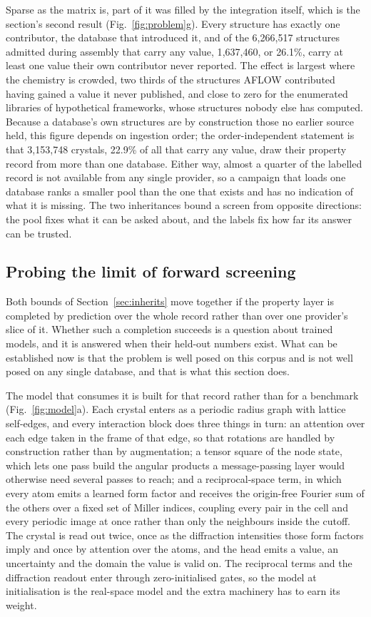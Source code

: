 Sparse as the matrix is, part of it was filled by the integration itself, which
is the section's second result (Fig.~\ref{fig:problem}g). Every structure has
exactly one contributor, the database that introduced it, and of the 6{,}266{,}517
structures admitted during assembly that carry any value, 1{,}637{,}460, or
26.1\%, carry at least one value their own contributor never reported. The effect
is largest where the chemistry is crowded, two thirds of the structures AFLOW
contributed having gained a value it never published, and close to zero for the
enumerated libraries of hypothetical frameworks, whose structures nobody else has
computed. Because a database's own structures are by construction those no
earlier source held, this figure depends on ingestion order; the order-independent
statement is that 3{,}153{,}748 crystals, 22.9\% of all that carry any value,
draw their property record from more than one database. Either way, almost a
quarter of the labelled record is not available from any single provider, so a
campaign that loads one database ranks a smaller pool than the one that exists
and has no indication of what it is missing. The two inheritances bound a screen
from opposite directions: the pool fixes what it can be asked about, and the
labels fix how far its answer can be trusted.

\subsection{Probing the limit of forward screening}
\label{sec:completion}

Both bounds of Section~\ref{sec:inherits} move together if the property layer is
completed by prediction over the whole record rather than over one provider's
slice of it. Whether such a completion succeeds is a question about trained
models, and it is answered when their held-out numbers exist. What can be
established now is that the problem is well posed on this corpus and is not well
posed on any single database, and that is what this section does.

The model that consumes it is built for that record rather than for a benchmark
(Fig.~\ref{fig:model}a). Each crystal enters as a periodic radius graph with
lattice self-edges, and every interaction block does three things in turn: an
attention over each edge taken in the frame of that edge, so that rotations are
handled by construction rather than by augmentation; a tensor square of the node
state, which lets one pass build the angular products a message-passing layer
would otherwise need several passes to reach; and a reciprocal-space term, in
which every atom emits a learned form factor and receives the origin-free Fourier
sum of the others over a fixed set of Miller indices, coupling every pair in the
cell and every periodic image at once rather than only the neighbours inside the
cutoff. The crystal is read out twice, once as the diffraction intensities those
form factors imply and once by attention over the atoms, and the head emits a
value, an uncertainty and the domain the value is valid on. The reciprocal terms
and the diffraction readout enter through zero-initialised gates, so the model at
initialisation is the real-space model and the extra machinery has to earn its
weight.

